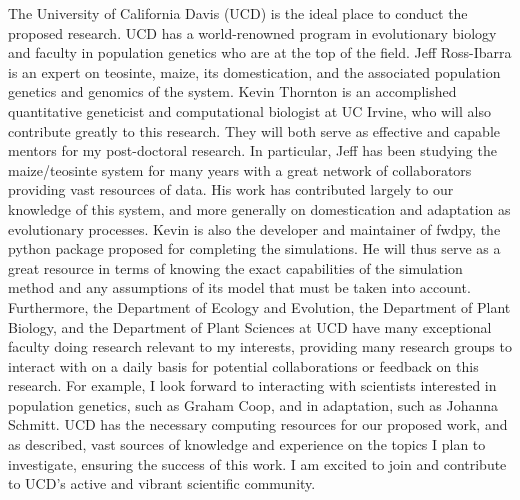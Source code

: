 The University of California Davis (UCD) is the ideal place to conduct the proposed research. UCD has a world-renowned program in evolutionary biology and faculty in population genetics who are at the top of the field. Jeff Ross\--Ibarra is an expert on teosinte, maize, its domestication, and the associated population genetics and genomics of the system.  
Kevin Thornton is an accomplished quantitative geneticist and computational biologist at UC Irvine, who will also contribute greatly to this research. 
They will both serve as effective and capable mentors for my post-doctoral research. In particular, Jeff has been studying the maize\//teosinte system for many %
years with a great network of collaborators providing vast resources of data. His work has contributed largely to our knowledge of this system, and more generally on domestication and adaptation as evolutionary processes. Kevin is also the developer and maintainer of fwdpy, the python package proposed for completing the simulations. He will thus serve as a great resource in terms of knowing the exact capabilities of the simulation method and any assumptions of its model that must be taken into account.
Furthermore, the Department of Ecology and Evolution, the Department of Plant Biology, and the Department of Plant Sciences at UCD have many exceptional faculty doing research relevant to my interests, providing many research groups to interact with on a daily basis for potential collaborations or feedback on this research. For example, I look forward to interacting with scientists interested in population genetics, such as Graham Coop, and in adaptation, such as Johanna Schmitt. %
UCD has the necessary computing resources for our proposed work, and as described, vast sources of knowledge and experience on the topics I plan to investigate, ensuring the success of this work. I am excited to join and contribute to UCD's active and vibrant scientific community.  


